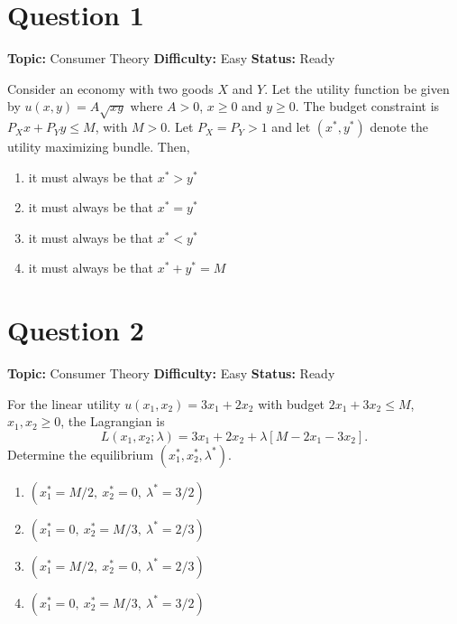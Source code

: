 \documentclass[11pt]{article}
\begin{document}
\newpage
\tableofcontents
\newpage

\section*{Question 1}


\noindent\textbf{Topic:} Consumer Theory \quad \textbf{Difficulty:} Easy \quad \textbf{Status:} Ready



Consider an economy with two goods $X$ and $Y$. Let the utility function be given by
$u(x,y) = A\sqrt{xy}$ where $A > 0$, $x \geq 0$ and $y \geq 0$. The budget constraint is
$P_X x + P_Y y \leq M$, with $M > 0$. Let $P_X = P_Y > 1$ and let $(x^*, y^*)$ denote the
utility maximizing bundle. Then,
\begin{enumerate}[label=(\Alph*)]
\item it must always be that $x^* > y^*$
\item it must always be that $x^* = y^*$
\item it must always be that $x^* < y^*$
\item it must always be that $x^* + y^* = M$
\end{enumerate}

\newpage

\section*{Question 2}


\noindent\textbf{Topic:} Consumer Theory \quad \textbf{Difficulty:} Easy \quad \textbf{Status:} Ready



For the linear utility $u(x_1,x_2) = 3x_1 + 2x_2$ with budget $2x_1 + 3x_2 \leq M$,
$x_1, x_2 \geq 0$, the Lagrangian is
\[
L(x_1,x_2;\lambda) = 3x_1 + 2x_2 + \lambda[M - 2x_1 - 3x_2].
\]
Determine the equilibrium $(x_1^*, x_2^*, \lambda^*)$.
\begin{enumerate}[label=(\Alph*)]
\item $(x_1^* = M/2,\ x_2^* = 0,\ \lambda^* = 3/2)$
\item $(x_1^* = 0,\ x_2^* = M/3,\ \lambda^* = 2/3)$
\item $(x_1^* = M/2,\ x_2^* = 0,\ \lambda^* = 2/3)$
\item $(x_1^* = 0,\ x_2^* = M/3,\ \lambda^* = 3/2)$
\end{enumerate}
\end{document}
